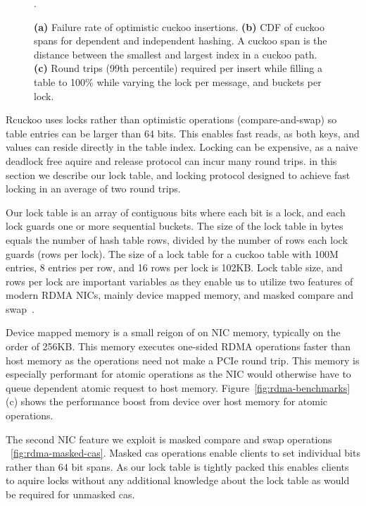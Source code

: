 \begin{figure}[t]
\begin{subfigure}{0.3\linewidth}
        \label{fig:tbd}
    \end{subfigure}.
    \vspace{-1em}
    \caption{
    \textbf{(a)} Failure rate of optimistic cuckoo insertions.
    \textbf{(b)} CDF of cuckoo spans for dependent and independent hashing. A cuckoo span is the distance between the smallest and largest index in a cuckoo path.
    \textbf{(c)} Round trips (99th percentile) required per insert while filling a table to 100\% while varying the lock per message, and buckets per lock. 
    }
    \label{fig:cuckoo-problems}

\end{figure}

Rcuckoo uses locks rather than optimistic operations
(compare-and-swap) so table entries can be larger than 64
bits. This enables fast reads, as both keys, and values can
reside directly in the table index. Locking can be
expensive, as a naive deadlock free aquire and release
protocol can incur many round trips.  in this section we
describe our lock table, and locking protocol designed to
achieve fast locking in an average of two round trips.

Our lock table is an array of contiguous bits where each bit
is a lock, and each lock guards one or more sequential
buckets. The size of the lock table in bytes equals the
number of hash table rows, divided by the number of rows
each lock guards (rows per lock). The size of a lock table
for a cuckoo table with 100M entries, 8 entries per row, and
16 rows per lock is 102KB.  Lock table size, and rows per
lock are important variables as they enable us to utilize
two features of modern RDMA NICs, mainly device mapped
memory, and masked compare and
swap~\cite{rdma-masked-cas,sherman}.

Device mapped memory is a small reigon of on NIC memory,
typically on the order of 256KB. This memory executes
one-sided RDMA operations faster than host memory as the
operations need not make a PCIe round trip. This memory is
especially performant for atomic operations as the NIC would
otherwise have to queue dependent atomic request to host
memory. Figure~\ref{fig:rdma-benchmarks}(c) shows the
performance boost from device over host memory for atomic
operations.

The second NIC feature we exploit is masked compare and swap
operations ~\ref{fig:rdma-masked-cas}. Masked cas operations
enable clients to set individual bits rather than 64 bit
spans. As our lock table is tightly packed this enables
clients to aquire locks without any additional knowledge
about the lock table as would be required for unmasked cas.

